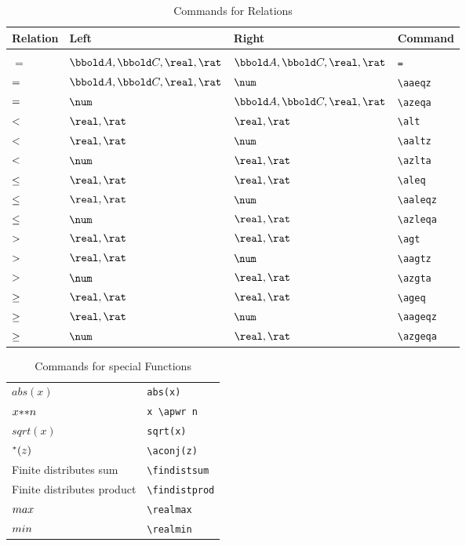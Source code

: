 \documentclass[12pt]{article}
\begin{document}
\begin{table}[htbp]
  \centering
  \begin{tabular}{llll}
    Relation & Left & Right & Command \\
    \hline \\
    $=$ & $\arithmos, \complex, \real, \rat$ & $\arithmos, \complex, \real, \rat$ & \verb|=| \\
    $=$ & $\arithmos, \complex, \real, \rat$ & $\num$ & \verb|\aaeqz| \\
    $=$ & $\num$ & $\arithmos, \complex, \real, \rat$ & \verb|\azeqa| \\
    $<$ & $\real, \rat$ & $\real, \rat$ & \verb|\alt| \\
    $<$ & $\real, \rat$ & $\num$ & \verb|\aaltz| \\
    $<$ & $\num$ & $\real, \rat$ & \verb|\azlta| \\
    $\leq$ & $\real, \rat$ & $\real, \rat$ & \verb|\aleq| \\
    $\leq$ & $\real, \rat$ & $\num$ & \verb|\aaleqz| \\
    $\leq$ & $\num$ & $\real, \rat$ & \verb|\azleqa| \\
    $>$ & $\real, \rat$ & $\real, \rat$ & \verb|\agt| \\
    $>$ & $\real, \rat$ & $\num$ & \verb|\aagtz| \\
    $>$ & $\num$ & $\real, \rat$ & \verb|\azgta| \\
    $\geq$ & $\real, \rat$ & $\real, \rat$ & \verb|\ageq| \\
    $\geq$ & $\real, \rat$ & $\num$ & \verb|\aageqz| \\
    $\geq$ & $\num$ & $\real, \rat$ & \verb|\azgeqa| \\
    \hline
  \end{tabular}
  \caption{Commands for Relations}
  \label{tab:latex-relations}
\end{table}
%
\begin{table}[htbp]
  \centering
  \begin{tabular}{ll}
    $abs(x)$    & \verb|abs(x)| \\
    $x {*}{*} n$    & \verb|x \apwr n| \\
    $sqrt(x)$    & \verb|sqrt(x)| \\
    $^{*}(z)$    & \verb|\aconj(z)|\\
    Finite distributes sum & \verb|\findistsum| \\
    Finite distributes product & \verb|\findistprod| \\
    $max$ & \verb|\realmax| \\
    $min$ & \verb|\realmin| \\
  \end{tabular}
  \caption{Commands for special Functions}
  \label{tab:latex-special-functions}
\end{table}
\end{document}
